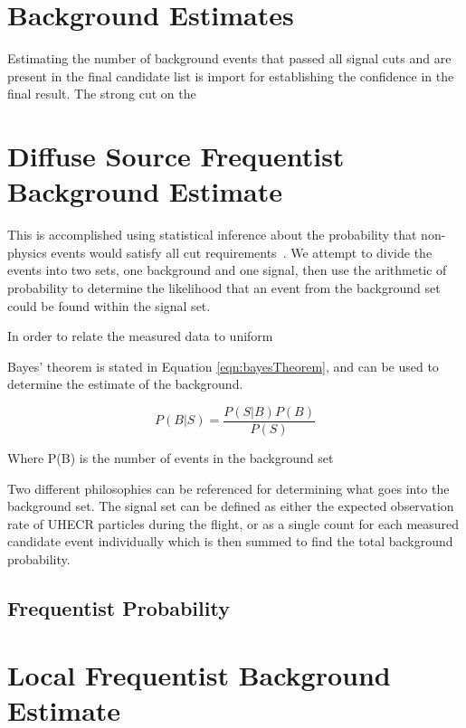 \section{Background Estimates}
	\label{sec:backgroundEstimate}
	Estimating the number of background events that passed all signal cuts and are present in the final candidate list is import for establishing the confidence in the final result.  The strong cut on the 

\section{Diffuse Source Frequentist Background Estimate}
	 This is accomplished using statistical inference about the probability that non-physics events would satisfy all cut requirements~\cite{ClassicalStatisticalEstimation}.  We attempt to divide the events into two sets, one background and one signal, then use the arithmetic of probability to determine the likelihood that an event from the background set could be found within the signal set.  

	In order to relate the measured data to uniform 
	
	Bayes' theorem is stated in Equation \ref{eqn:bayesTheorem}, and can be used to determine the estimate of the background.

	\begin{equation}
		P(B | S) = \frac{P(S | B) P(B)}{P(S)}
	\label{eqn:bayesTheorem}
	\end{equation}
	
	Where P(B) is the number of events in the background set
	
	
	Two different philosophies can be referenced for determining what goes into the background set.  The signal set can be defined as either the expected observation rate of UHECR particles during the flight, or as a single count for each measured candidate event individually which is then summed to find the total background probability.
	
	\subsection{Frequentist Probability}
		
		
\section{Local Frequentist Background Estimate}
	




